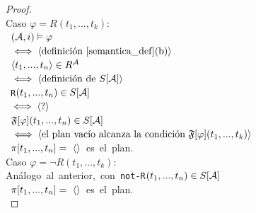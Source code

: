 \begin{proof}
\ \\
Caso $\varphi = R(t_1,...,t_k)$:\\
\mbox{\hspace{10mm} $(\mathcal{A}, i) \vDash \varphi$}\\
\mbox{\hspace{5mm} $\iff \langle \text{definición \ref{semantica_def}(b)} \rangle$}\\
\mbox{\hspace{10mm} $\langle t_1,...,t_n \rangle \in R^{\mathcal{A}}$}\\
\mbox{\hspace{5mm} $\iff \langle \text{definición de $S[\mathcal{A}]$} \rangle$}\\
\mbox{\hspace{10mm} \texttt{R}$(t_1,...,t_n) \in S[\mathcal{A}]$}\\
\mbox{\hspace{5mm} $\iff \langle \text{?} \rangle$}\\
\mbox{\hspace{10mm} $\mathfrak{F}[\varphi](t_1,...,t_n) \in S[\mathcal{A}]$}\\
\mbox{\hspace{5mm} $\iff \langle \text{el plan vacío alcanza la condición
$\mathfrak{F}[\varphi](t_1,...,t_k)$} \rangle$}\\
\mbox{\hspace{10mm} $\pi[t_1,...,t_n] =\ \tup{} $ es el plan.}\\

\noindent Caso $\varphi = \neg R(t_1,...,t_k)$:\\
\mbox{\hspace{10mm}Análogo al anterior, con \texttt{not-R}$(t_1,...,t_n) \in
S[\mathcal{A}]$}\\
\mbox{\hspace{10mm} $\pi[t_1,...,t_n] =\ \tup{} $ es el plan.}\\


\end{proof}
